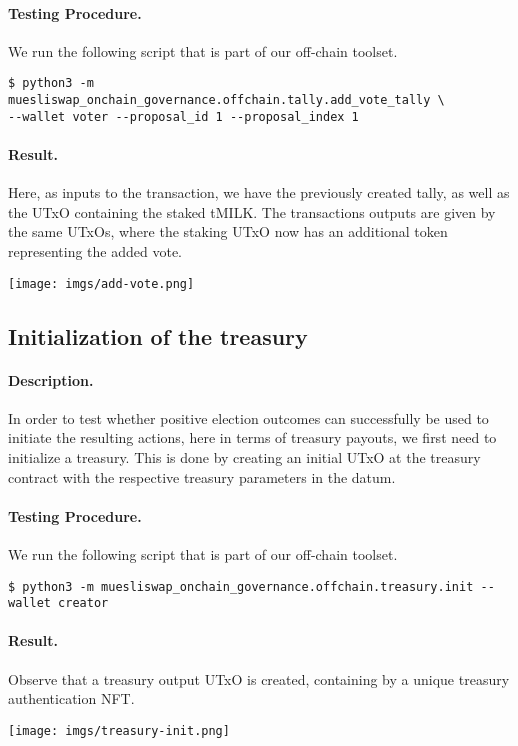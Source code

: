 \documentclass[11pt]{article}
\begin{document}
\paragraph{Testing Procedure.} We run the following script that is part of our off-chain toolset.
\begin{verbatim}
$ python3 -m muesliswap_onchain_governance.offchain.tally.add_vote_tally \
--wallet voter --proposal_id 1 --proposal_index 1
\end{verbatim}
\paragraph{Result.} Here, as inputs to the transaction, we have the previously created tally, as well as the UTxO containing the staked tMILK. The transactions outputs are given by the same UTxOs, where the staking UTxO now has an additional token representing the added vote.
\bigskip

\texttt{[image: imgs/add-vote.png]}

\subsection{Initialization of the treasury}
\paragraph{Description.} In order to test whether positive election outcomes can successfully be used to initiate the resulting actions, here in terms of treasury payouts, we first need to initialize a treasury. This is done by creating an initial UTxO at the treasury contract with the respective treasury parameters in the datum.

\paragraph{Testing Procedure.} We run the following script that is part of our off-chain toolset.
\begin{verbatim}
$ python3 -m muesliswap_onchain_governance.offchain.treasury.init --wallet creator
\end{verbatim}
\paragraph{Result.} Observe that a treasury output UTxO is created, containing by a unique treasury authentication NFT.
\bigskip

\texttt{[image: imgs/treasury-init.png]}
\end{document}
